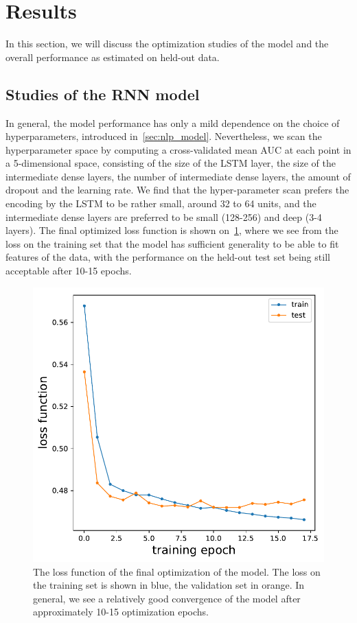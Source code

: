 \section{Results}
In this section, we will discuss the optimization studies of the model and the overall performance as estimated on held-out data.

\subsection{Studies of the RNN model}
In general, the model performance has only a mild dependence on the choice of hyperparameters, introduced in~\cref{sec:nlp_model}. Nevertheless, we scan the hyperparameter space by computing a cross-validated mean AUC at each point in a 5-dimensional space, consisting of the size of the LSTM layer, the size of the intermediate dense layers, the number of intermediate dense layers, the amount of dropout and the learning rate. We find that the hyper-parameter scan prefers the encoding by the LSTM to be rather small, around 32 to 64 units, and the intermediate dense layers are preferred to be small (128-256) and deep (3-4 layers). The final optimized loss function is shown on~\cref{fig:loss}, where we see from the loss on the training set that the model has sufficient generality to be able to fit features of the data, with the performance on the held-out test set being still acceptable after 10-15 epochs.

\begin{figure}[ht]
\centering
\includegraphics[width=0.5\linewidth]{figures/lingvist/loss.pdf}
\caption[Loss function for the knowledge estimation model]{The loss function of the final optimization of the model. The loss on the training set is shown in blue, the validation set in orange. In general, we see a relatively good convergence of the model after approximately 10-15 optimization epochs.} 
\label{fig:loss} 
\end{figure} 


